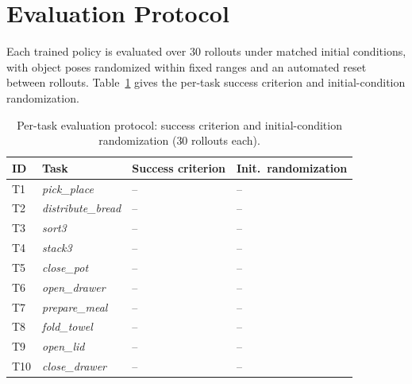 \documentclass{article}
\begin{document}
\section{Evaluation Protocol}
\label{app:evalproto}

Each trained policy is evaluated over $30$ rollouts under matched initial
conditions, with object poses randomized within fixed ranges and an automated
reset between rollouts. Table~\ref{tab:evalproto} gives the per-task success
criterion and initial-condition randomization.

\begin{table}[h]
\centering
\caption{Per-task evaluation protocol: success criterion and initial-condition randomization ($30$ rollouts each).}
\label{tab:evalproto}
\small
\setlength{\tabcolsep}{6pt}
\begin{tabular}{llll}
\toprule
\textbf{ID} & \textbf{Task} & \textbf{Success criterion} & \textbf{Init.\ randomization} \\
\midrule
T1  & \textit{pick\_place}       & -- & -- \\
T2  & \textit{distribute\_bread} & -- & -- \\
T3  & \textit{sort3}             & -- & -- \\
T4  & \textit{stack3}            & -- & -- \\
T5  & \textit{close\_pot}        & -- & -- \\
T6  & \textit{open\_drawer}      & -- & -- \\
T7  & \textit{prepare\_meal}     & -- & -- \\
T8  & \textit{fold\_towel}       & -- & -- \\
T9  & \textit{open\_lid}         & -- & -- \\
T10 & \textit{close\_drawer}     & -- & -- \\
\bottomrule
\end{tabular}
\end{table}
\end{document}
